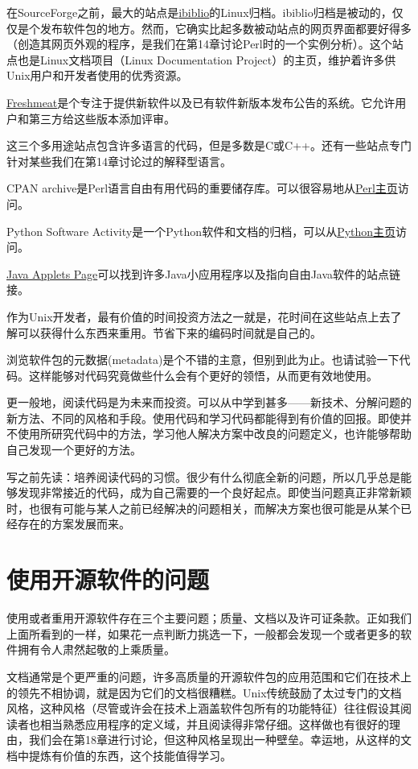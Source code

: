 \documentclass[12pt,oneside]{ctexbook}
\begin{document}
\begin{common-format}
在SourceForge之前，最大的站点是\href{http://www.ibiblio.org/}{ibiblio}的Linux归档。ibiblio归档是被动的，仅仅是个发布软件包的地方。然而，它确实比起多数被动站点的网页界面都要好得多（创造其网页外观的程序，是我们在第14章讨论Perl时的一个实例分析）。这个站点也是Linux文档项目（Linux Documentation Project）的主页，维护着许多供Unix用户和开发者使用的优秀资源。

\href{http://www.freshmeat.net/}{Freshmeat}是个专注于提供新软件以及已有软件新版本发布公告的系统。它允许用户和第三方给这些版本添加评审。

这三个多用途站点包含许多语言的代码，但是多数是C或C++。还有一些站点专门针对某些我们在第14章讨论过的解释型语言。

CPAN archive是Perl语言自由有用代码的重要储存库。可以很容易地从\href{http://www.perl.com/perl}{Perl主页}访问。

Python Software Activity是一个Python软件和文档的归档，可以从\href{http://www.python.org/}{Python主页}访问。

\href{http://java.sun.com/applets/}{Java  Applets  Page}可以找到许多Java小应用程序以及指向自由Java软件的站点链接。

作为Unix开发者，最有价值的时间投资方法之一就是，花时间在这些站点上去了解可以获得什么东西来重用。节省下来的编码时间就是自己的。

浏览软件包的元数据(metadata)是个不错的主意，但别到此为止。也请试验一下代码。这样能够对代码究竟做些什么会有个更好的领悟，从而更有效地使用。

更一般地，阅读代码是为未来而投资。可以从中学到甚多——新技术、分解问题的新方法、不同的风格和手段。使用代码和学习代码都能得到有价值的回报。即使并不使用所研究代码中的方法，学习他人解决方案中改良的问题定义，也许能够帮助自己发现一个更好的方法。

写之前先读：培养阅读代码的习惯。很少有什么彻底全新的问题，所以几乎总是能够发现非常接近的代码，成为自己需要的一个良好起点。即使当问题真正非常新颖时，也很有可能与某人之前已经解决的问题相关，而解决方案也很可能是从某个已经存在的方案发展而来。

\section{使用开源软件的问题}
使用或者重用开源软件存在三个主要问题；质量、文档以及许可证条款。正如我们上面所看到的一样，如果花一点判断力挑选一下，一般都会发现一个或者更多的软件拥有令人肃然起敬的上乘质量。

文档通常是个更严重的问题，许多高质量的开源软件包的应用范围和它们在技术上的领先不相协调，就是因为它们的文档很糟糕。Unix传统鼓励了太过专门的文档风格，这种风格（尽管或许会在技术上涵盖软件包所有的功能特征）往往假设其阅读者也相当熟悉应用程序的定义域，并且阅读得非常仔细。这样做也有很好的理由，我们会在第18章进行讨论，但这种风格呈现出一种壁垒。幸运地，从这样的文档中提炼有价值的东西，这个技能值得学习。


\end{common-format}
\end{document}
